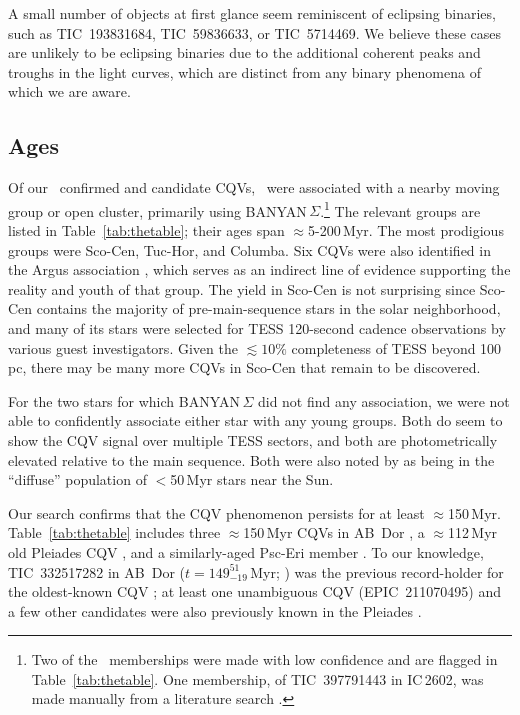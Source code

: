 \documentclass[11pt,twocolumn,tighten]{aastex63}
\begin{document}
A small number of objects at first glance seem reminiscent of
eclipsing binaries, such as TIC~193831684, TIC~59836633, or
TIC~5714469.  We believe these cases are unlikely to be eclipsing
binaries due to the additional coherent peaks and troughs in the light
curves, which are distinct from any binary phenomena of which we are
aware.



\subsection{Ages}

Of our \ncqvsnodebunked\ confirmed and candidate CQVs,
\nnotfieldbanyan\ were associated with a nearby moving group or open
cluster, primarily using BANYAN\,$\Sigma$.\footnote{Two of the
\nnotfieldbanyan\ memberships were made with low confidence and are
flagged in Table~\ref{tab:thetable}.  One membership, of TIC~397791443
in IC\,2602, was made manually from a literature search
\citep[e.g.][]{2020A&A...633A..99C}.}  The relevant groups are listed
in Table~\ref{tab:thetable}; their ages span $\approx$5-200\,Myr.  The
most prodigious groups were Sco-Cen, Tuc-Hor, and Columba.  Six CQVs
were also identified in the Argus association
\citep{2019ApJ...870...27Z}, which serves as an indirect line of
evidence supporting the reality and youth of that group.  The yield in
Sco-Cen is not surprising since Sco-Cen contains the majority of
pre-main-sequence stars in the solar neighborhood, and many of its
stars were selected for TESS 120-second cadence observations by
various guest investigators.  Given the $\lesssim$$10\%$ completeness
of TESS beyond 100\,pc, there may be many more CQVs in Sco-Cen that
remain to be discovered.  

For the two stars for which BANYAN\,$\Sigma$ did not find any
association, we were not able to confidently associate either star
with any young groups.  Both do seem to show the CQV signal over
multiple TESS sectors, and both are photometrically elevated relative
to the main sequence.  Both were also noted by
\citet{2021ApJ...917...23K} as being in the ``diffuse'' population of
$<$50\,Myr stars near the Sun.

Our search confirms that the CQV phenomenon persists for at least
$\approx$150\,Myr.  Table~\ref{tab:thetable} includes three
$\approx$150\,Myr CQVs in AB~Dor \citep{2015MNRAS.454..593B}, a
$\approx$112\,Myr old Pleiades CQV \citep{2015ApJ...813..108D}, and a
similarly-aged Psc-Eri member \citep{2020A&A...639A..64R}.  To our
knowledge, TIC~332517282 in AB~Dor ($t$$=$$149^{51}_{-19}$\,Myr;
\citealt{2015MNRAS.454..593B}) was the previous record-holder for the
oldest-known CQV \citep{2019ApJ...876..127Z,2022AJ....163..144G}; at
least one unambiguous CQV (EPIC~211070495) and a few other candidates
were also previously known in the Pleiades
\citep{2016AJ....152..114R}.  
\end{document}
